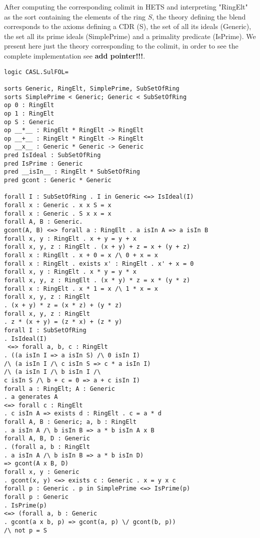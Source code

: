 After computing the corresponding colimit in HETS and interpreting
"RingElt" as the sort containing the elements of the ring $S$, the
theory defining the blend corresponds to the axioms defining a CDR
(S), the set of all its ideals (Generic), the set all its prime ideals
(SimplePrime) and a primality predicate (IsPrime).  We present here
just the theory corresponding to the colimit, in order to see the
complete implementation see \textbf{add pointer!!!}.


\begin{verbatim}
logic CASL.SulFOL=

sorts Generic, RingElt, SimplePrime, SubSetOfRing
sorts SimplePrime < Generic; Generic < SubSetOfRing
op 0 : RingElt
op 1 : RingElt
op S : Generic
op __*__ : RingElt * RingElt -> RingElt
op __+__ : RingElt * RingElt -> RingElt
op __x__ : Generic * Generic -> Generic
pred IsIdeal : SubSetOfRing
pred IsPrime : Generic
pred __isIn__ : RingElt * SubSetOfRing
pred gcont : Generic * Generic

forall I : SubSetOfRing . I in Generic <=> IsIdeal(I)
forall x : Generic . x x S = x 
forall x : Generic . S x x = x 
forall A, B : Generic.
gcont(A, B) <=> forall a : RingElt . a isIn A => a isIn B
forall x, y : RingElt . x + y = y + x 
forall x, y, z : RingElt . (x + y) + z = x + (y + z)
forall x : RingElt . x + 0 = x /\ 0 + x = x 
forall x : RingElt . exists x' : RingElt . x' + x = 0
forall x, y : RingElt . x * y = y * x 
forall x, y, z : RingElt . (x * y) * z = x * (y * z)
forall x : RingElt . x * 1 = x /\ 1 * x = x 
forall x, y, z : RingElt
. (x + y) * z = (x * z) + (y * z) 
forall x, y, z : RingElt 
. z * (x + y) = (z * x) + (z * y) 
forall I : SubSetOfRing
. IsIdeal(I)
 <=> forall a, b, c : RingElt
. ((a isIn I => a isIn S) /\ 0 isIn I)
/\ (a isIn I /\ c isIn S => c * a isIn I)
/\ (a isIn I /\ b isIn I /\ 
c isIn S /\ b + c = 0 => a + c isIn I)                                              
forall a : RingElt; A : Generic
. a generates A
<=> forall c : RingElt 
. c isIn A => exists d : RingElt . c = a * d                                                  
forall A, B : Generic; a, b : RingElt
. a isIn A /\ b isIn B => a * b isIn A x B        
forall A, B, D : Generic
. (forall a, b : RingElt
. a isIn A /\ b isIn B => a * b isIn D)
=> gcont(A x B, D)                             
forall x, y : Generic
. gcont(x, y) <=> exists c : Generic . x = y x c 
forall p : Generic . p in SimplePrime <=> IsPrime(p)
forall p : Generic
. IsPrime(p)
<=> (forall a, b : Generic
. gcont(a x b, p) => gcont(a, p) \/ gcont(b, p))
/\ not p = S                             

\end{verbatim}



